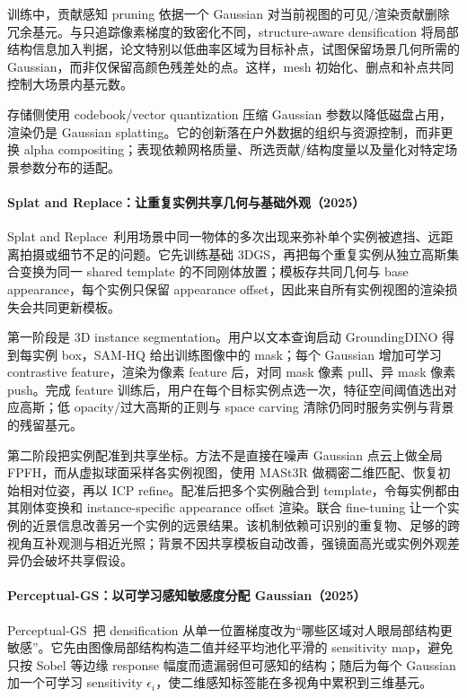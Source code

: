 训练中，贡献感知 pruning 依据一个 Gaussian 对当前视图的可见/渲染贡献删除冗余基元。与只追踪像素梯度的致密化不同，structure-aware densification 将局部结构信息加入判据，论文特别以低曲率区域为目标补点，试图保留场景几何所需的 Gaussian，而非仅保留高颜色残差处的点。这样，mesh 初始化、删点和补点共同控制大场景内基元数。

存储侧使用 codebook/vector quantization 压缩 Gaussian 参数以降低磁盘占用，渲染仍是 Gaussian splatting。它的创新落在户外数据的组织与资源控制，而非更换 alpha compositing；表现依赖网格质量、所选贡献/结构度量以及量化对特定场景参数分布的适配。

\paragraph{Splat and Replace：让重复实例共享几何与基础外观（2025）\cite{2506_06462}}
Splat and Replace~\cite{2506_06462}利用场景中同一物体的多次出现来弥补单个实例被遮挡、远距离拍摄或细节不足的问题。它先训练基础 3DGS，再把每个重复实例从独立高斯集合变换为同一 shared template 的不同刚体放置；模板存共同几何与 base appearance，每个实例只保留 appearance offset，因此来自所有实例视图的渲染损失会共同更新模板。

第一阶段是 3D instance segmentation。用户以文本查询启动 GroundingDINO 得到每实例 box，SAM-HQ 给出训练图像中的 mask；每个 Gaussian 增加可学习 contrastive feature，渲染为像素 feature 后，对同 mask 像素 pull、异 mask 像素 push。完成 feature 训练后，用户在每个目标实例点选一次，特征空间阈值选出对应高斯；低 opacity/过大高斯的正则与 space carving 清除仍同时服务实例与背景的残留基元。

第二阶段把实例配准到共享坐标。方法不是直接在噪声 Gaussian 点云上做全局 FPFH，而从虚拟球面采样各实例视图，使用 MASt3R 做稠密二维匹配、恢复初始相对位姿，再以 ICP refine。配准后把多个实例融合到 template，令每实例都由其刚体变换和 instance-specific appearance offset 渲染。联合 fine-tuning 让一个实例的近景信息改善另一个实例的远景结果。该机制依赖可识别的重复物、足够的跨视角互补观测与相近光照；背景不因共享模板自动改善，强镜面高光或实例外观差异仍会破坏共享假设。

\paragraph{Perceptual-GS：以可学习感知敏感度分配 Gaussian（2025）\cite{2506_12400}}
Perceptual-GS~\cite{2506_12400}把 densification 从单一位置梯度改为“哪些区域对人眼局部结构更敏感”。它先由图像局部结构构造二值并经平均池化平滑的 sensitivity map，避免只按 Sobel 等边缘 response 幅度而遗漏弱但可感知的结构；随后为每个 Gaussian 加一个可学习 sensitivity $\epsilon_i$，使二维感知标签能在多视角中累积到三维基元。

